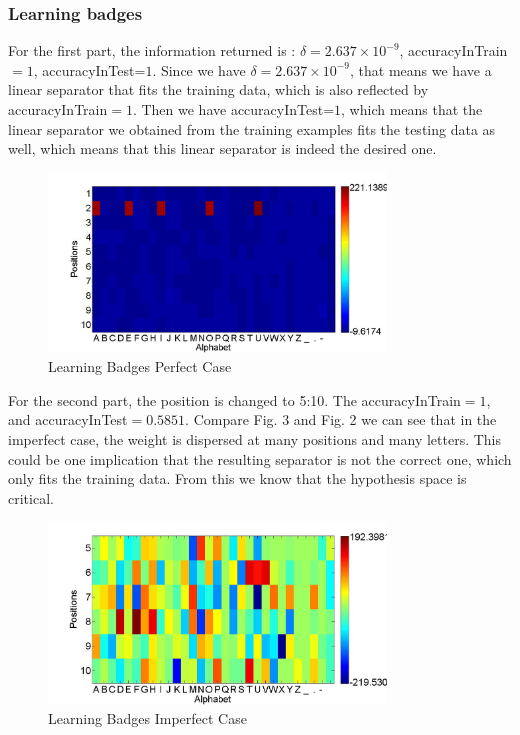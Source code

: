 \subsubsection{Learning badges}
For the first part, the information returned is : $\delta=2.637\times10^{-9}$, accuracyInTrain$=1$, accuracyInTest=$1$. 
Since we have $\delta=2.637\times10^{-9}$, that means we have a linear separator that fits the training data, which is also reflected by accuracyInTrain$=1$. Then we have accuracyInTest=$1$, which means that the linear separator we obtained from the training examples fits the testing data as well, which means that this linear separator is indeed the desired one. 
\begin{figure}[h!]
	\centering
	\includegraphics[width=0.8\textwidth]{LearnBadges}
	\caption{Learning Badges Perfect Case}
\end{figure}

\noindent For the second part, the position is changed to 5:10. The accuracyInTrain$=1$, and accuracyInTest$=0.5851$. Compare Fig. 3 and Fig. 2 we can see that in the imperfect case, the weight is dispersed at many positions and many letters. This could be one implication that the resulting separator is not the correct one, which only fits the training data. From this we know that the hypothesis space is critical. 
\begin{figure}[h!]
	\centering
	\includegraphics[width=0.8\textwidth]{LearBadges2}
	\caption{Learning Badges Imperfect Case}
\end{figure}


